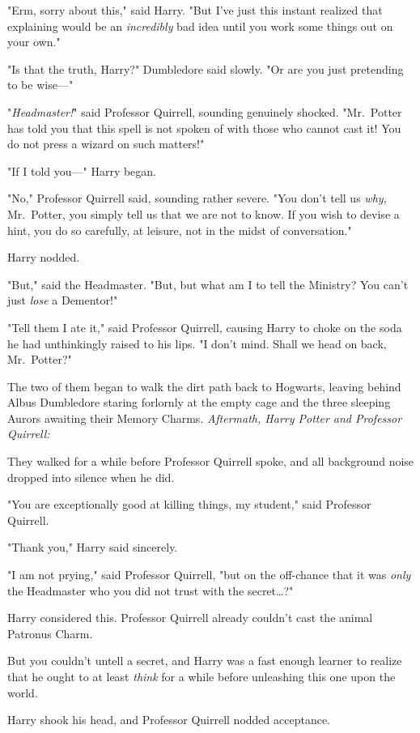 "Erm, sorry about this," said Harry. "But I've just this instant realized that 
explaining would be an \emph{incredibly} bad idea until you work some things 
out on your own."

"Is that the truth, Harry?" Dumbledore said slowly. "Or are you just pretending 
to be wise---"

"\emph{Headmaster!}" said Professor Quirrell, sounding genuinely shocked. 
"Mr.~Potter has told you that this spell is not spoken of with those who cannot 
cast it! You do not press a wizard on such matters!"

"If I told you---" Harry began.

"No," Professor Quirrell said, sounding rather severe. "You don't tell us 
\emph{why,} Mr.~Potter, you simply tell us that we are not to know. If you wish 
to devise a hint, you do so carefully, at leisure, not in the midst of 
conversation."

Harry nodded.

"But," said the Headmaster. "But, but what am I to tell the Ministry? You can't 
just \emph{lose} a Dementor!"

"Tell them I ate it," said Professor Quirrell, causing Harry to choke on the 
soda he had unthinkingly raised to his lips. "I don't mind. Shall we head on 
back, Mr.~Potter?"

The two of them began to walk the dirt path back to Hogwarts, leaving behind 
Albus Dumbledore staring forlornly at the empty cage and the three sleeping 
Aurors awaiting their Memory Charms.
\sbreak
\emph{Aftermath, Harry Potter and Professor Quirrell:}

They walked for a while before Professor Quirrell spoke, and all background 
noise dropped into silence when he did.

"You are exceptionally good at killing things, my student," said Professor 
Quirrell.

"Thank you," Harry said sincerely.

"I am not prying," said Professor Quirrell, "but on the off-chance that it was 
\emph{only} the Headmaster who you did not trust with the secret{\ldots}?"

Harry considered this. Professor Quirrell already couldn't cast the animal 
Patronus Charm.

But you couldn't untell a secret, and Harry was a fast enough learner to 
realize that he ought to at least \emph{think} for a while before unleashing 
this one upon the world.

Harry shook his head, and Professor Quirrell nodded acceptance.

